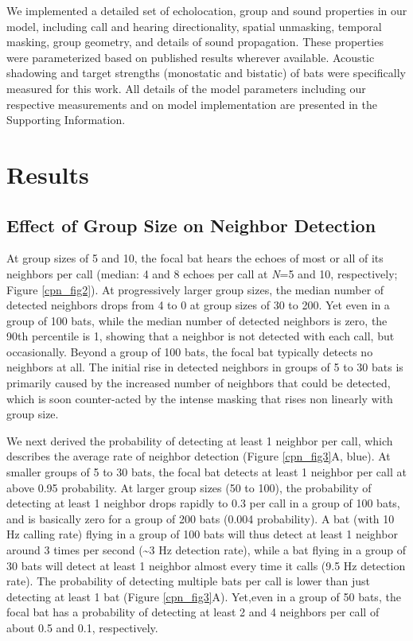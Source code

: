 \documentclass[
]{book}
\begin{document}
We implemented a detailed set of echolocation, group and sound properties in our model, including call and hearing directionality, spatial unmasking, temporal masking, group geometry, and details of sound propagation. These properties were parameterized based on published results wherever available. Acoustic shadowing and target strengths (monostatic and bistatic) of bats were specifically measured for this work. All details of the model parameters including our respective measurements and on model implementation are presented in the Supporting Information.

\hypertarget{results}{%
\section{Results}\label{results}}

\hypertarget{effect-of-group-size-on-neighbor-detection}{%
\subsection{Effect of Group Size on Neighbor Detection}\label{effect-of-group-size-on-neighbor-detection}}

At group sizes of 5 and 10, the focal bat hears the echoes of most or all of its neighbors per call (median: 4 and 8 echoes per call at \emph{N}=5 and 10, respectively; Figure \ref{cpn_fig2}). At progressively larger group sizes, the median number of detected neighbors drops from 4 to 0 at group sizes of 30 to 200. Yet even in a group of 100 bats, while the median number of detected neighbors is zero, the 90th percentile is 1, showing that a neighbor is not detected with each call, but occasionally. Beyond a group of 100 bats, the focal bat typically detects no neighbors at all. The initial rise in detected neighbors in groups of 5 to 30 bats is primarily caused by the increased number of neighbors that could be detected, which is soon counter-acted by the intense masking that rises non linearly with group size.

We next derived the probability of detecting at least 1 neighbor per call, which describes the average rate of neighbor detection (Figure \ref{cpn_fig3}A, blue). At smaller groups of 5 to 30 bats, the focal bat detects at least 1 neighbor per call at above 0.95 probability. At larger group sizes (50 to 100), the probability of detecting at least 1 neighbor drops rapidly to 0.3 per call in a group of 100 bats, and is basically zero for a group of 200 bats (0.004 probability). A bat (with 10 Hz calling rate) flying in a group of 100 bats will thus detect at least 1 neighbor around 3 times per second (\textasciitilde 3 Hz detection rate), while a bat flying in a group of 30 bats will detect at least 1 neighbor almost every time it calls (9.5 Hz detection rate). The probability of detecting multiple bats per call is lower than just detecting at least 1 bat (Figure \ref{cpn_fig3}A). Yet,even in a group of 50 bats, the focal bat has a probability of detecting at least 2 and 4 neighbors per call of about 0.5 and 0.1, respectively.
\end{document}
